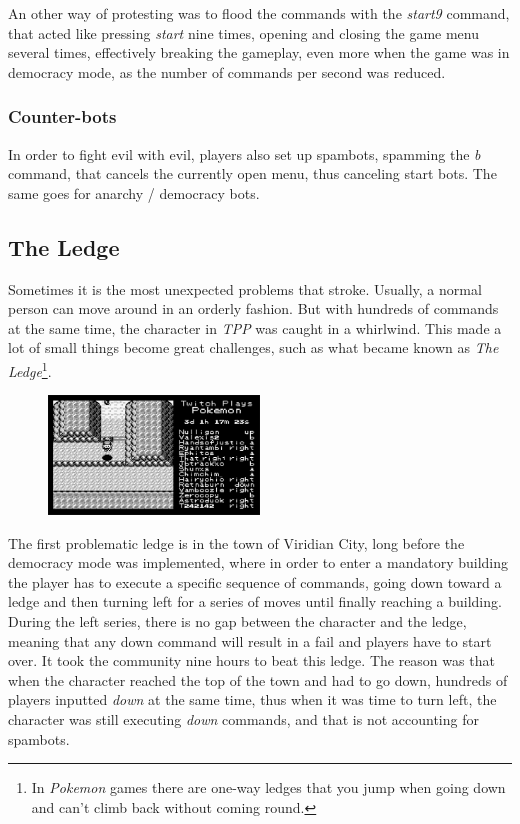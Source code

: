 \documentclass[a4paper]{article}
\begin{document}
An other way of protesting was to flood the commands with the \textit{start9} command, that acted like pressing \textit{start} nine times, opening and closing the game menu several times, effectively breaking the gameplay, even more when the game was in democracy mode, as the number of commands per second was reduced.

\subsubsection{Counter-bots}

In order to fight evil with evil, players also set up spambots, spamming the \textit{b} command, that cancels the currently open menu, thus canceling start bots. The same goes for anarchy / democracy bots.

\subsection{The Ledge}

Sometimes it is the most unexpected problems that stroke. Usually, a normal person can move around in an orderly fashion. But with hundreds of commands at the same time, the character in \textit{TPP} was caught in a whirlwind. This made a lot of small things become great challenges, such as what became known as \textit{The Ledge}\footnote{In \textit{Pokemon} games there are one-way ledges that you jump when going down and can't climb back without coming round.}.

\begin{figure}[h]
\includegraphics[width=0.5\textwidth,center]{pictures/ledge1.png}
\end{figure}

The first problematic ledge is in the town of Viridian City, long before the democracy mode was implemented, where in order to enter a mandatory building the player has to execute a specific sequence of commands, going down toward a ledge and then turning left for a series of moves until finally reaching a building. During the left series, there is no gap between the character and the ledge, meaning that any down command will result in a fail and players have to start over.
It took the community nine hours to beat this ledge. The reason was that when the character reached the top of the town and had to go down, hundreds of players inputted \textit{down} at the same time, thus when it was time to turn left, the character was still executing \textit{down} commands, and that is not accounting for spambots.
\end{document}
